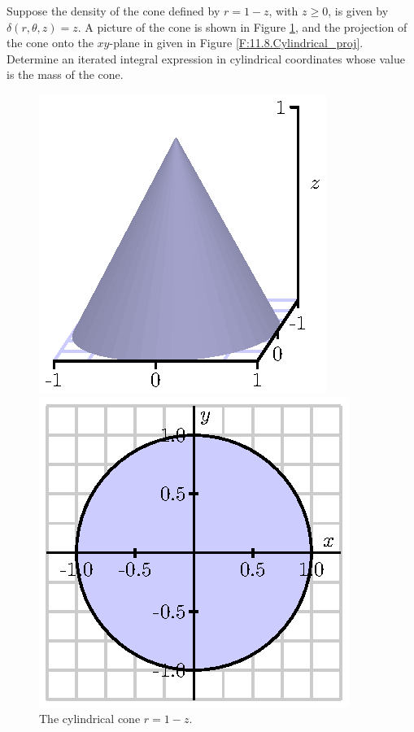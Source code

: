 \begin{activity} \label{A:11.8.4} Suppose the density of the cone defined by $r = 1 - z$, with $z \geq 0$, is given by $\delta(r, \theta, z) = z$. A picture of the cone is shown in Figure \ref{F:11.8.Cylindrical_ex}, and the projection of the cone onto the $xy$-plane in given in Figure \ref{F:11.8.Cylindrical_proj}.  Determine an iterated integral expression in cylindrical coordinates whose value is the mass of the cone.
\begin{figure}[ht]
\begin{center}
\begin{minipage}{2.5in}
\begin{center}
  \includegraphics{figures/fig_11_8_cone.eps}
\end{center}
\caption{The cylindrical cone $r = 1-z$.}
\label{F:11.8.Cylindrical_ex}
\end{minipage} \hspace{0.5in}
\begin{minipage}{2.5in}
\begin{center}
  \includegraphics{figures/fig_11_8_cone_project.eps}

\end{center}
\end{minipage}
\end{center}
\end{figure}
\end{activity}
